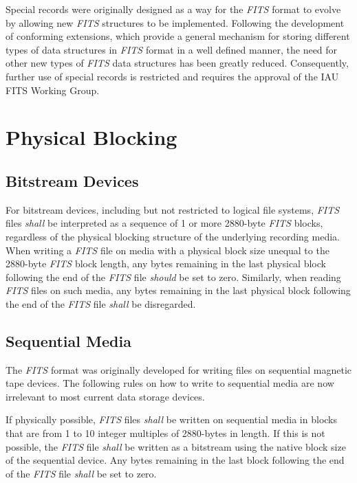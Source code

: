 \documentclass[11pt,makeidx]{book}     %
\begin{document}
   Special records were originally designed as a way for the {\em FITS\/}
   format to evolve by allowing new {\em FITS\/} structures to be implemented.  
   Following the development of conforming extensions, which provide a general
   mechanism for storing different types of data structures in {\em FITS\/} format in
   a well defined manner, the need for other new types of {\em FITS\/} data
   structures has been greatly reduced.  Consequently, further use of special
   records is restricted and requires the approval of the IAU FITS Working 
   Group.

   \section{Physical Blocking}
   \label{s:PhysBlk}  
    \subsection{Bitstream Devices}     
     \label{s:BitDev}
For bitstream devices, including but not restricted to  logical file systems, 
{\em FITS\/} files {\em shall} be interpreted as a sequence  of 1 or more 2880-byte
{\em FITS\/} blocks, regardless of the physical blocking structure of the
underlying recording media.  When writing a {\em FITS\/} file on  media with a
physical block size unequal to the 2880-byte {\em FITS\/} block  length, any
bytes remaining in the last physical block following  the end of the {\em
FITS\/} file {\em should} be set to zero.  Similarly, when reading  {\em FITS\/}
files on such media, any bytes remaining in the last physical block following 
the end of the {\em FITS\/} file {\em shall} be disregarded. 

    \subsection{Sequential Media}

The {\em FITS\/} format was originally developed for writing files
on sequential magnetic tape devices.  The following rules on how to write
to sequential media \cite{grosbol94} are now irrelevant to most current data storage
devices.

If physically possible, {\em FITS\/} files {\em shall} be written on sequential 
media in blocks that are from 1 to 10 integer multiples of
2880-bytes in length.  If this is not possible, the {\em FITS\/} file {\em shall}
be written as a bitstream using the native block size of the sequential device.
Any bytes remaining in the last block following  the end of the 
{\em FITS\/} file {\em shall} be set to zero.
\end{document}
